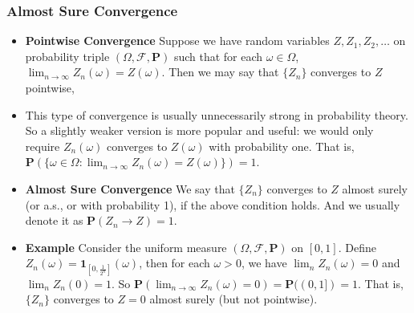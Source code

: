 \documentclass[handout]{beamer}
\newcommand{\BP}{\mathbf{P}}
\newcommand{\BI}{\mathbf{1}}
\begin{document}
\frame
{
  \frametitle{Almost Sure Convergence}

   \begin{itemize}
       \item<1-> \textbf{Pointwise Convergence} Suppose we have random variables $Z, Z_1, Z_2, \ldots $ on probability triple $(\Omega,\mathcal{F}, \BP)$ such that for each $\omega \in \Omega$, $\lim_{n\rightarrow \infty} Z_n(\omega)= Z(\omega)$. Then we may say that $\{Z_n\}$ converges to $Z$ pointwise, 
       
 
       \item<2-> This type of convergence is usually unnecessarily strong in probability theory. So a slightly weaker version is more popular and useful: we would only require $Z_n(\omega)$ converges to $Z(\omega)$ with probability one. That is, $\BP(\{\omega \in \Omega: \lim_{n\rightarrow \infty} Z_n(\omega)= Z(\omega) \})=1$. 


     \item<3-> \textbf{Almost Sure Convergence} We say that $\{Z_n\}$ converges to $Z$ almost surely (or a.s., or with probability 1), if the above condition holds. And we usually denote it as $\BP(Z_n\rightarrow Z)=1$.
     
       \item<4-> \textbf{Example} Consider the uniform measure $(\Omega,\mathcal{F}, \BP)$ on $[0,1]$. Define $Z_n(\omega)=\BI_{[0,\frac{1}{2^n}]} (\omega)$, then for each $\omega>0$, we have $\lim_n Z_n(\omega)=0$ and $\lim_n Z_n (0)=1$. So  $\BP(\lim_{n\rightarrow \infty} Z_n(\omega)= 0)=\BP((0,1])=1$. That is, $\{Z_n\}$ converges to $Z=0$ almost surely (but not pointwise). 
                
\end{itemize}
}
\end{document}
